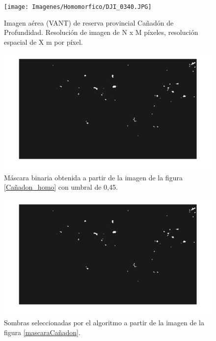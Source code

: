 \begin{figure}[h!]
    \texttt{[image: Imagenes/Homomorfico/DJI\_0340.JPG]}
     \hfill
     \caption{Imagen aérea (VANT) de reserva provincial Cañadón de Profundidad. Resolución de imagen de N x M píxeles, resolución espacial de X m por píxel.}
    \label{Cañadon_homo2}
\end{figure}

\begin{figure}[h!]
    \includegraphics[width=\textwidth]{Imagenes/Homomorfico/DJI_340_bin.png}
     \hfill
     \caption{Máscara binaria obtenida a partir de la imagen de la figura \ref{Cañadon_homo} con umbral de 0,45.}
    \label{mascaraCañadon2}
\end{figure}

\begin{figure}[h!]
    \includegraphics[width=\textwidth]{Imagenes/Homomorfico/DJI_340_bin.png}
     \hfill
     \caption{Sombras seleccionadas por el algoritmo a partir de la imagen de la figura \ref{mascaraCañadon}.}
    \label{seleccionadaCañadon2}
\end{figure}